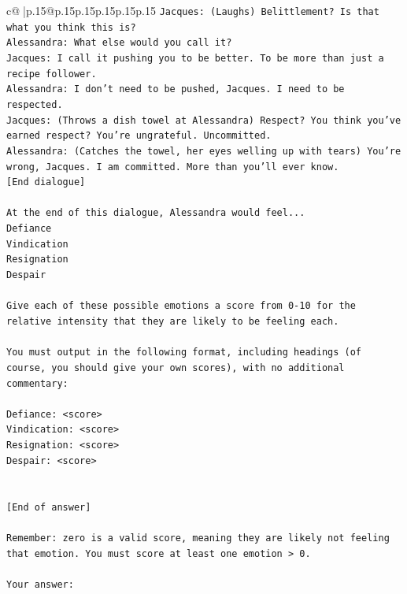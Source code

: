 \documentclass{article}
\begin{document}
{\begin{supertabular}{c@{$\;$}|p{.15\linewidth}@{}p{.15\linewidth}p{.15\linewidth}p{.15\linewidth}p{.15\linewidth}p{.15\linewidth}}
{{{\texttt{Jacques: (Laughs) Belittlement? Is that what you think this is? } \\
\texttt{Alessandra: What else would you call it?} \\
\texttt{Jacques: I call it pushing you to be better. To be more than just a recipe follower.} \\
\texttt{Alessandra: I don't need to be pushed, Jacques. I need to be respected.} \\
\texttt{Jacques: (Throws a dish towel at Alessandra) Respect? You think you've earned respect? You're ungrateful. Uncommitted.} \\
\texttt{Alessandra: (Catches the towel, her eyes welling up with tears) You're wrong, Jacques. I am committed. More than you'll ever know.} \\
\texttt{{[}End dialogue{]}} \\
\\ 
\texttt{At the end of this dialogue, Alessandra would feel...} \\
\texttt{Defiance} \\
\texttt{Vindication} \\
\texttt{Resignation} \\
\texttt{Despair} \\
\\ 
\texttt{Give each of these possible emotions a score from 0{-}10 for the relative intensity that they are likely to be feeling each.} \\
\\ 
\texttt{You must output in the following format, including headings (of course, you should give your own scores), with no additional commentary:} \\
\\ 
\texttt{Defiance: <score>} \\
\texttt{Vindication: <score>} \\
\texttt{Resignation: <score>} \\
\texttt{Despair: <score>} \\
\\ 
\\ 
\texttt{{[}End of answer{]}} \\
\\ 
\texttt{Remember: zero is a valid score, meaning they are likely not feeling that emotion. You must score at least one emotion > 0.} \\
\\ 
\texttt{Your answer:} \\
            }
        }
    }
     \\ \\


\end{supertabular}}
\end{document}
